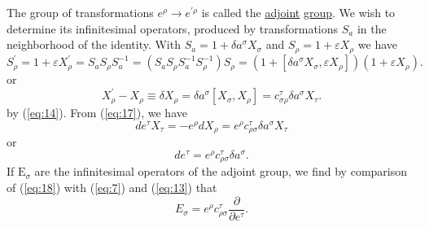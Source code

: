 The group of transformations \(e^\rho \rightarrow e^{\prime \rho}\) is called the
\underline{adjoint} \underline{group}. We wish to determine its infinitesimal
operators, produced by transformations \(S_a\) in the neighborhood of the identity. With
\(S_a=1+\delta a^{\sigma} X_\sigma\) and \(S_\rho=1+\varepsilon X_\rho\) we have
\[
S_\rho^{\prime}=1+\varepsilon X_\rho^{\prime}=
S_a S_\rho S_a^{-1}=
\left(S_a S_\rho S_a^{-1} S_\rho^{-1}\right) S_\rho=
\left(1+\left[\delta a^{\sigma} X_{\sigma}, \varepsilon X_\rho\right]\right)
\left(1+\varepsilon X_\rho\right).
\]
or
\[
X_\rho^{\prime}-X_\rho \equiv \delta X_\rho=
\delta a^{\sigma} \left[X_\sigma, X_\rho\right]=
c_{\sigma \rho}^{\tau} \delta a^{\sigma} X_\tau .
\]
by (\ref{eq:14}). From (\ref{eq:17}), we have
\[
d e^\tau X_\tau=-e^\rho d X_\rho=
e^\rho c_{\rho \sigma}^{\tau} \delta a{ }^\sigma X_\tau
\]
or
\begin{equation}\label{eq:18}
d e^\tau=e^\rho c_{\rho \sigma}^\tau \delta a^\sigma.
\end{equation}
If \(\mathrm{E}_\sigma\) are the infinitesimal operators of the adjoint group,
we find by comparison of (\ref{eq:18}) with (\ref{eq:7}) and (\ref{eq:13}) that
\begin{equation}\label{eq:19}
E_{\sigma}=e^{\rho} c_{\rho \sigma}^{\tau} \frac{\partial}{\partial e^{\tau}}.
\end{equation}
